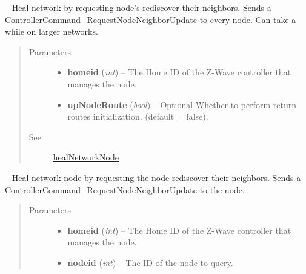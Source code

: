 \documentclass[letterpaper,10pt,english]{sphinxmanual}
\begin{document}
\begin{fulllineitems}

\begin{fulllineitems}
\label{libopenzwave:libopenzwave.PyManager.healNetwork}~\label{libopenzwave:healnetwork}
Heal network by requesting node's rediscover their neighbors.
Sends a ControllerCommand\_RequestNodeNeighborUpdate to every node.
Can take a while on larger networks.
\begin{quote}\begin{description}
\item[{Parameters}] \leavevmode\begin{itemize}
\item {} 
\textbf{homeid} (\emph{int}) -- The Home ID of the Z-Wave controller that manages the node.

\item {} 
\textbf{upNodeRoute} (\emph{bool}) -- Optional Whether to perform return routes initialization. (default = false).

\end{itemize}

\item[{See}] \leavevmode
{\hyperref[libopenzwave:healnetworknode]{healNetworkNode}}

\end{description}\end{quote}

\end{fulllineitems}


\begin{fulllineitems}
\label{libopenzwave:libopenzwave.PyManager.healNetworkNode}~\label{libopenzwave:healnetworknode}
Heal network node by requesting the node rediscover their neighbors.
Sends a ControllerCommand\_RequestNodeNeighborUpdate to the node.
\begin{quote}\begin{description}
\item[{Parameters}] \leavevmode\begin{itemize}
\item {} 
\textbf{homeid} (\emph{int}) -- The Home ID of the Z-Wave controller that manages the node.

\item {} 
\textbf{nodeid} (\emph{int}) -- The ID of the node to query.


\end{itemize}
\end{description}
\end{quote}
\end{fulllineitems}
\end{fulllineitems}
\end{document}
